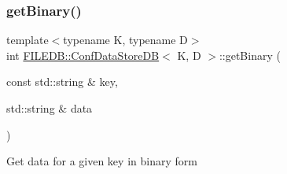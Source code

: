 \subsubsection{\texorpdfstring{getBinary()}{getBinary()}\hspace{0.1cm}{\footnotesize\ttfamily [1/3]}}
{\footnotesize\ttfamily template$<$typename K, typename D$>$ \\
int \mbox{\hyperlink{classFILEDB_1_1ConfDataStoreDB}{F\+I\+L\+E\+D\+B\+::\+Conf\+Data\+Store\+DB}}$<$ K, D $>$\+::get\+Binary (\begin{DoxyParamCaption}\item[{const std\+::string \&}]{key,  }\item[{std\+::string \&}]{data }\end{DoxyParamCaption})\hspace{0.3cm}{\ttfamily [inline]}}

Get data for a given key in binary form


